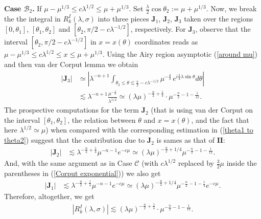 \documentclass[11pt, reqno]{amsart}
\theoremstyle{plain}
\theoremstyle{remark}
\theoremstyle{example}
\theoremstyle{definition}
\numberwithin{equation}{section}
\begin{document}
\noindent \textbf{Case $\mathcal{B}_2$.} If $\mu - \mu^{1/3} \leq c \lambda^{1/2} \leq \mu + \mu^{1/3}$. Set $\frac{\lambda}{2} \cos{\theta_{2}}:=\mu + \mu^{1/3}$. Now, we break the the integral in $R_{k}^{I}(\lambda, \sigma)$ into three pieces $\textbf{J}_1$, $\textbf{J}_2$, $\textbf{J}_{3}$ taken over the regions $[0, \theta_{1}]$, $[\theta_{1}, \theta_{2}]$ and $[\theta_{2}, \pi/2 - c \lambda^{-1/2}]$, respectively. For $\textbf{J}_{3}$, observe that the interval $[\theta_{2}, \pi/2 - c \lambda^{-1/2}]$ in $x=x(\theta)$ coordinates reads as $\mu - \mu^{1/3} \leq c \lambda^{1/2} \leq x \leq \mu + \mu^{1/3}$. Using the Airy region asymptotic  (\ref{around mu}) and then van der Corput lemma we obtain
\begin{equation*}
  \begin{split}
      |\textbf{J}_{3} | &  \simeq \left| \lambda^{-n+1}  \int_{\theta_{2} \leq \theta \lesssim \frac{\pi}{2} - c \lambda^{-1/2}} \mu^{{-\textstyle\frac{4}{3}} }   \, e^{i \frac{1}{4} \lambda \sin{\theta}}    d \theta \right|\\
      & \lesssim \lambda^{-n+1} \frac{  \mu^{{-\textstyle\frac{4}{3}} }  }{ \lambda^{1/2}   } \simeq (\lambda \mu)^{- \frac{n}{2} + \frac{1}{4}} \cdot \mu^{- \frac{n}{2} - 1 - \frac{1}{12}} .
  \end{split}
\end{equation*}
The prospective computations for the term $\textbf{J}_{2}$ (that is using van der Corput on the interval $[\theta_{1}, \theta_{2}]$, the relation between $\theta$ and $x=x(\theta)$, and the fact that here $\lambda^{1/2} \simeq \mu$) when compared with the corresponding estimation in (\ref{theta1 to theta2}) suggest that  the contribution due to $\textbf{J}_{2}$ is sames as that of $\textbf{II}$:
\begin{equation*}
  \begin{split}
     | \textbf{J}_{2} | & \lesssim   \lambda^{ -\frac{n}{2} + \frac{1}{4}} \mu^{-n-1} e^{-c \mu} \simeq (\lambda \mu)^{ -\frac{n}{2} + 1/4} \mu^{-\frac{n}{2}-1-\frac{1}{12}}  .
  \end{split}
\end{equation*}
And, with the same argument as in Case $\mathcal{C}$ (with $c\lambda^{1/2}$ replaced by $\frac{3}{2} \mu$ inside the parentheses in (\ref{Corput exponential})) we also get
\begin{equation*}
  \begin{split}
     | \textbf{J}_{1} | & \lesssim   \lambda^{ -\frac{n}{2} + \frac{1}{4}} \mu^{-n-1} e^{-c \mu} \simeq (\lambda \mu)^{ -\frac{n}{2} + 1/4} \mu^{-\frac{n}{2}-1-\frac{1}{4}} e^{-c \mu} .\end{split}
\end{equation*}
Therefore, altogether, we get  
\begin{equation} \label{conclusion CaseB2}
  \begin{split}
      |R_{k}^{I}(\lambda, \sigma)| \lesssim  (\lambda \mu)^{- \frac{n}{2} + \frac{1}{4}} \cdot \mu^{- \frac{n}{2} - 1 - \frac{1}{12}}.
  \end{split}
\end{equation}
\end{document}
